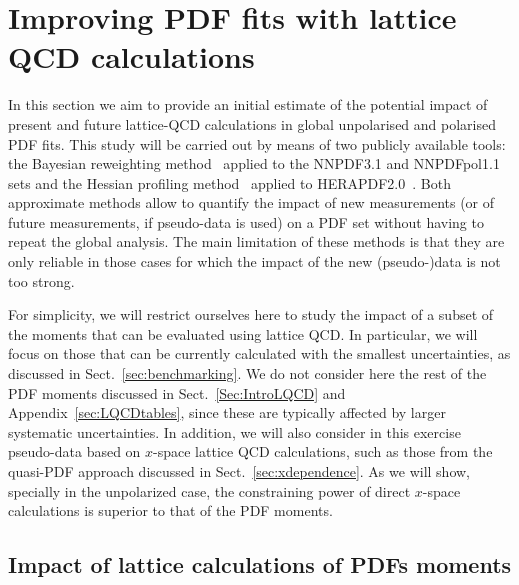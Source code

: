\section{Improving PDF fits with lattice QCD calculations}
\label{sec:projections}

In this section we aim to provide an initial estimate of the potential
impact of present and future lattice-QCD calculations
in global unpolarised and polarised PDF fits.
%
This study will be carried out by means of two publicly available
tools: the
Bayesian reweighting
method~\cite{Ball:2011gg,Ball:2010gb} applied to the
NNPDF3.1 and NNPDFpol1.1 sets and the Hessian
profiling method~\cite{Camarda:2015zba} applied to
HERAPDF2.0~\cite{Abramowicz:2015mha}.
%
Both approximate methods allow to quantify the impact of new measurements
(or of future measurements, if pseudo-data is used) on a PDF set without
having to repeat the global analysis.
%
The main limitation of these methods is that they are only reliable
in those cases for which the impact of the new (pseudo-)data
is not too strong.

For simplicity, we will restrict  ourselves here to study the
impact of a subset of the moments that can be
evaluated using lattice QCD.
%
In particular,
we will focus on those that can be currently calculated
with the smallest uncertainties, as discussed in
Sect.~\ref{sec:benchmarking}.
%
We do not consider here
the rest of the PDF moments discussed in
Sect.~\ref{Sec:IntroLQCD} and Appendix~\ref{sec:LQCDtables},
since these are typically affected by larger systematic uncertainties.
%
In addition, we
will also consider in this exercise pseudo-data based on $x$-space
lattice QCD calculations, such as those from the quasi-PDF approach
discussed in Sect.~\ref{sec:xdependence}.
%
As we will show, specially in the unpolarized case, the
constraining power of direct $x$-space calculations is
superior to that of the PDF moments.

\subsection{Impact of lattice calculations of PDFs moments}











